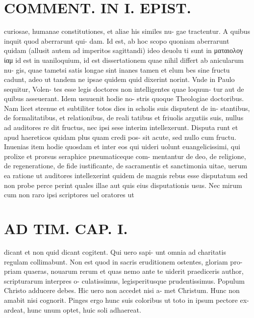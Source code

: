 \documentclass{article}
\begin{document}
\begin{pages}
\section*{COMMENT. IN I. EPIST. }\pstart curiosae, humanae constitutiones, et aliae his similes nu- gae tractentur. A quibus inquit quod aberrarunt qui- dam. Id est, ab hoc scopo quoniam aberrarunt quidam (allusit autem ad imperitos sagittandi) ideo deuolu ti sunt in ματαιολογ ίαμ id est in uaniloquium, id est dissertationem quae nihil differt ab anicularum nu- gis, quae tametsi satis longae sint inanes tamen et elum bes sine fructu cadunt, adeo ut tandem ne ipsae quidem quid dixerint norint. Vnde in Paulo sequitur, Volen- tes esse legis doctores non intelligentes quae loquun- tur aut de quibus asseuerant. Idem usuuenit hodie no- stris quoque Theologiae doctoribus. Nam licet strenue et subtiliter totos dies in scholis suis disputent de in- stantibus, de formalitatibus, et relationibus, de reali tatibus et friuolis argutiis suis, nullus ad auditores re dit fructus, nec ipsi sese interim intellexerunt. Disputa runt et apud haereticos quidam plus quam credi pos- sit acute, sed nullo cum fructu. Inuenias item hodie quosdam et inter eos qui uideri uolunt euangelicissimi, qui prolixe et prorsus seraphice pneumaticeque com- mentantur de deo, de religione, de regeneratione, de fide iustificante, de sacramentis et sanctimonia uitae, uerum ea ratione ut auditores intellexerint quidem de magnis rebus esse disputatum sed non probe perce perint quales illae aut quis eius disputationis usus. Nec mirum cum non raro ipsi scriptores uel oratores ut  \pend
\section*{AD TIM. CAP. I. }
\marginpar{[ p.100 ]}\pstart dicant et non quid dicant cogitent. Qui uero sapi- unt omnia ad charitatis regulam collimabunt. Non est quod in sacris eruditionem ostentes, gloriam pro- priam quaeras, nouarum rerum et quas nemo ante te uiderit praediceris author, scripturarum interpres o- culatissimus, legisperitusque prudentissimus. Populum Christo adducere debes. Hic uero non accedet nisi a- met Christum. Hunc non amabit nisi cognorit. Pinges ergo hunc suis coloribus ut toto in ipsum pectore ex- ardeat, hunc unum optet, huic soli adhaereat.  \pend
{}
{}

\end{pages}
\end{document}

